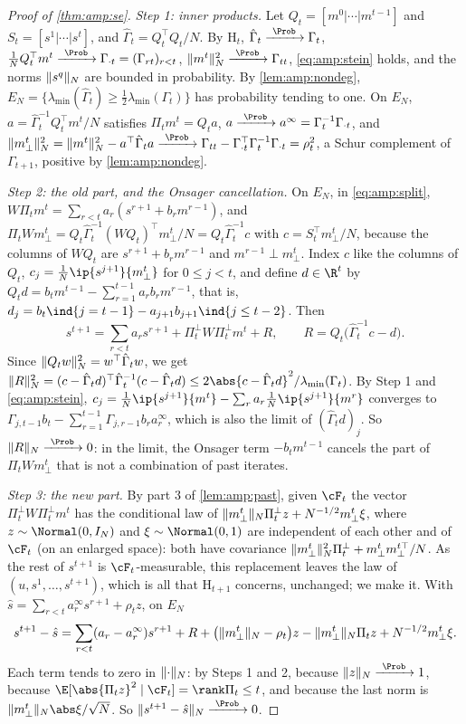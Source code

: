 \begin{refsection}
\begin{proof}[Proof of \cref{thm:amp:se}]
\emph{Step 1: inner products.} Let $Q_t=[m^0|\cdots|m^{t-1}]$ and $S_t=[s^1|\cdots|s^t]$, and $\hat\Gamma_t=Q_t^\top Q_t/N$. By $\mathrm H_t$, $\hat\Gamma_t\ampto\Gamma_t$, $\frac1NQ_t^\top m^t\ampto\Gamma_{\cdot t}=(\Gamma_{rt})_{r<t}$, $\ampnorm{m^t}^2\ampto\Gamma_{tt}$, \eqref{eq:amp:stein} holds, and the norms $\lVert s^q\rVert_N$ are bounded in probability. By \cref{lem:amp:nondeg}, $E_N=\{\lambda_{\min}(\hat\Gamma_t)\ge\frac12\lambda_{\min}(\Gamma_t)\}$ has probability tending to one. On $E_N$, $a=\hat\Gamma_t^{-1}Q_t^\top m^t/N$ satisfies $\Pi_tm^t=Q_ta$, $a\ampto a^\infty=\Gamma_t^{-1}\Gamma_{\cdot t}$, and $\ampnorm{m^t_\perp}^2=\ampnorm{m^t}^2-a^\top\hat\Gamma_ta\ampto\Gamma_{tt}-\Gamma_{\cdot t}^\top\Gamma_t^{-1}\Gamma_{\cdot t}=\rho_t^2$, a Schur complement of $\Gamma_{t+1}$, positive by \cref{lem:amp:nondeg}.

\emph{Step 2: the old part, and the Onsager cancellation.} On $E_N$, in \eqref{eq:amp:split}, $W\Pi_tm^t=\sum_{r<t}a_r(s^{r+1}+b_rm^{r-1})$, and $\Pi_tWm^t_\perp=Q_t\hat\Gamma_t^{-1}(WQ_t)^\top m^t_\perp/N=Q_t\hat\Gamma_t^{-1}c$ with $c=S_t^\top m^t_\perp/N$, because the columns of $WQ_t$ are $s^{r+1}+b_rm^{r-1}$ and $m^{r-1}\perp m^t_\perp$. Index $c$ like the columns of $Q_t$, $c_j=\frac1N\ip{s^{j+1}}{m^t_\perp}$ for $0\le j<t$, and define $d\in\R^t$ by $Q_td=b_tm^{t-1}-\sum_{r=1}^{t-1}a_rb_rm^{r-1}$, that is, $d_j=b_t\ind\{j=t-1\}-a_{j+1}b_{j+1}\ind\{j\le t-2\}$. Then
\[
s^{t+1}=\sum_{r<t}a_rs^{r+1}+\Pi_t^\perp W\Pi_t^\perp m^t+R,\qquad R=Q_t\bigl(\hat\Gamma_t^{-1}c-d\bigr).
\]
Since $\lVert Q_tw\rVert_N^2=w^\top\hat\Gamma_tw$, we get $\ampnorm R^2=(c-\hat\Gamma_td)^\top\hat\Gamma_t^{-1}(c-\hat\Gamma_td)\le2\abs{c-\hat\Gamma_td}^2/\lambda_{\min}(\Gamma_t)$. By Step 1 and \eqref{eq:amp:stein}, $c_j=\frac1N\ip{s^{j+1}}{m^t}-\sum_ra_r\frac1N\ip{s^{j+1}}{m^r}$ converges to $\Gamma_{j,t-1}b_t-\sum_{r=1}^{t-1}\Gamma_{j,r-1}b_ra^\infty_r$, which is also the limit of $(\hat\Gamma_td)_j$. So $\ampnorm R\ampto0$: in the limit, the Onsager term $-b_tm^{t-1}$ cancels the part of $\Pi_tWm^t_\perp$ that is not a combination of past iterates.

\emph{Step 3: the new part.} By part 3 of \cref{lem:amp:past}, given $\cF_t$ the vector $\Pi_t^\perp W\Pi_t^\perp m^t$ has the conditional law of $\lVert m^t_\perp\rVert_N\Pi_t^\perp z+N^{-1/2}m^t_\perp\xi$, where $z\sim\Normal(0,I_N)$ and $\xi\sim\Normal(0,1)$ are independent of each other and of $\cF_t$ (on an enlarged space): both have covariance $\lVert m^t_\perp\rVert_N^2\Pi_t^\perp+m^t_\perp m^{t\top}_\perp/N$. As the rest of $s^{t+1}$ is $\cF_t$-measurable, this replacement leaves the law of $(u,s^1,\dots,s^{t+1})$, which is all that $\mathrm H_{t+1}$ concerns, unchanged; we make it. With $\hat s=\sum_{r<t}a^\infty_rs^{r+1}+\rho_tz$, on $E_N$
\[
s^{t+1}-\hat s=\sum_{r<t}(a_r-a^\infty_r)s^{r+1}+R+\bigl(\lVert m^t_\perp\rVert_N-\rho_t\bigr)z-\lVert m^t_\perp\rVert_N\Pi_tz+N^{-1/2}m^t_\perp\xi.
\]
Each term tends to zero in $\lVert \cdot\rVert_N$: by Steps 1 and 2, because $\ampnorm z\ampto1$, because $\E[\abs{\Pi_tz}^2\mid\cF_t]=\rank\Pi_t\le t$, and because the last norm is $\ampnorm{m^t_\perp}\abs\xi/\sqrt N$. So $\ampnorm{s^{t+1}-\hat s}\ampto0$.


\end{proof}
\end{refsection}
